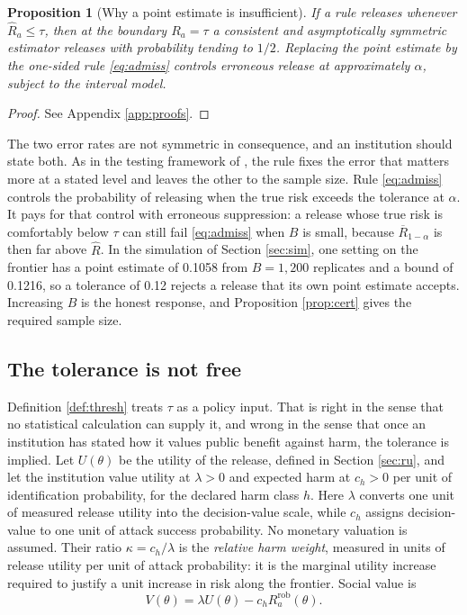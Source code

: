 \documentclass[11pt,a4paper]{article}
\theoremstyle{plain}
\newtheorem{proposition}{Proposition}
\theoremstyle{definition}
\begin{document}
\begin{proposition}[Why a point estimate is insufficient]\label{prop:point}
If a rule releases whenever $\widehat{R}_a \leq \tau$, then at the boundary
$R_a = \tau$ a consistent and asymptotically symmetric estimator releases with
probability tending to $1/2$. Replacing the point estimate by the one-sided
rule \eqref{eq:admiss} controls erroneous release at approximately $\alpha$,
subject to the interval model.
\end{proposition}

\begin{proof}
See Appendix \ref{app:proofs}.
\end{proof}

The two error rates are not symmetric in consequence, and an institution should
state both. As in the testing framework of \citet{neyman1933}, the rule fixes
the error that matters more at a stated level and leaves the other to the sample
size. Rule \eqref{eq:admiss} controls the probability of releasing when
the true risk exceeds the tolerance at $\alpha$. It pays for that control with
erroneous suppression: a release whose true risk is comfortably below $\tau$
can still fail \eqref{eq:admiss} when $B$ is small, because $\overline{R}_{1-\alpha}$ is
then far above $\widehat{R}$. In the simulation of Section \ref{sec:sim}, one setting on
the frontier has a point estimate of 0.1058 from $B = 1{,}200$ replicates and a
bound of 0.1216, so a tolerance of 0.12 rejects a release that its own point
estimate accepts. Increasing $B$ is the honest response, and Proposition
\ref{prop:cert} gives the required sample size.

\subsection{The tolerance is not free}

Definition \ref{def:thresh} treats $\tau$ as a policy input. That is right in
the sense that no statistical calculation can supply it, and wrong in the sense
that once an institution has stated how it values public benefit against harm,
the tolerance is implied. Let $U(\theta)$ be the utility of the release, defined
in Section \ref{sec:ru}, and let the institution value utility at $\lambda > 0$
and expected harm at $c_h > 0$ per unit of identification probability, for the
declared harm class $h$. Here $\lambda$ converts one unit of measured release utility into the
decision-value scale, while $c_h$ assigns decision-value to one unit of
attack success probability. No monetary valuation is assumed. Their ratio
$\kappa=c_h/\lambda$ is the \emph{relative harm weight}, measured in
units of release utility per unit of attack probability: it is the marginal
utility increase required to justify a unit increase in risk along the frontier. Social value is
\begin{equation}
V(\theta) = \lambda U(\theta) - c_h R_a^{\mathrm{rob}}(\theta) .
\label{eq:value}
\end{equation}
\end{document}

